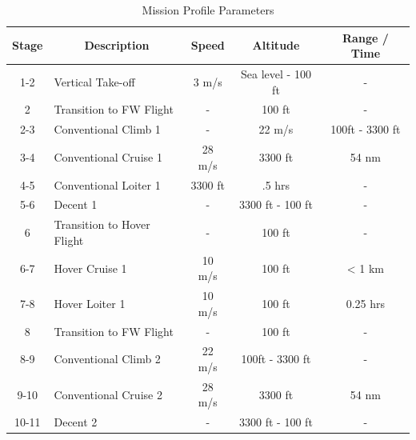 \begin{table}[H]
\begin{center}
    \caption{Mission Profile Parameters}
    \label{tab:PP}
\begin{tabular}{|c|l|c|c|c|}
\hline
\textbf{Stage} & \multicolumn{1}{c|}{\textbf{Description}} & \textbf{Speed} & \textbf{Altitude} & \textbf{Range / Time} \\ \hline \hline
1-2            & Vertical Take-off                    &  3 m/s              & Sea level - 100 ft        &       -                \\ \hline
2            & Transition to FW Flight                  & -              & 100 ft        &       -                \\ \hline
2-3            & Conventional Climb 1                                 & -              & 22 m/s         &       100ft - 3300 ft                 \\ \hline
3-4            & Conventional Cruise 1                    & 28 m/s       &      3300 ft              &      54 nm                 \\ \hline
4-5            & Conventional Loiter 1                                  &  3300 ft           & .5 hrs     & -          \\ \hline
5-6            & Decent 1                                  & -              & 3300 ft - 100 ft           & -             \\ \hline
6            & Transition to Hover Flight                                   & -              & 100 ft           & -             \\ \hline
6-7            & Hover Cruise 1                                    & 10 m/s              & 100 ft           &  < 1 km             \\ \hline
7-8            & Hover Loiter 1                                    & 10 m/s              & 100 ft           &  0.25 hrs             \\ \hline
8            & Transition to FW Flight                  & -              & 100 ft        &       -                \\ \hline
8-9            & Conventional Climb 2                                 &22 m/s         &       100ft - 3300 ft & - \\ \hline
9-10            & Conventional Cruise 2                    & 28 m/s       &      3300 ft              &      54 nm                 \\ \hline
10-11            & Decent 2                                  & -              & 3300 ft - 100 ft           & -             \\ \hline

\end{tabular}
\end{center}
\end{table}
